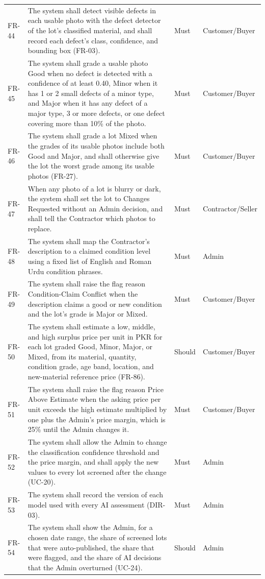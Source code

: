 {\begin{longtable}{@{}p{}p{}p{}p{}@{}}
FR-44 & The system shall detect visible defects in each usable photo with the defect detector of the lot's classified material, and shall record each defect's class, confidence, and bounding box (FR-03). & Must & Customer/Buyer \\
FR-45 & The system shall grade a usable photo Good when no defect is detected with a confidence of at least 0.40, Minor when it has 1 or 2 small defects of a minor type, and Major when it has any defect of a major type, 3 or more defects, or one defect covering more than 10\% of the photo. & Must & Customer/Buyer \\
FR-46 & The system shall grade a lot Mixed when the grades of its usable photos include both Good and Major, and shall otherwise give the lot the worst grade among its usable photos (FR-27). & Must & Customer/Buyer \\
FR-47 & When any photo of a lot is blurry or dark, the system shall set the lot to Changes Requested without an Admin decision, and shall tell the Contractor which photos to replace. & Must & Contractor/Seller \\
FR-48 & The system shall map the Contractor's description to a claimed condition level using a fixed list of English and Roman Urdu condition phrases. & Must & Admin \\
FR-49 & The system shall raise the flag reason Condition-Claim Conflict when the description claims a good or new condition and the lot's grade is Major or Mixed. & Must & Customer/Buyer \\
FR-50 & The system shall estimate a low, middle, and high surplus price per unit in PKR for each lot graded Good, Minor, Major, or Mixed, from its material, quantity, condition grade, age band, location, and new-material reference price (FR-86). & Should & Customer/Buyer \\
FR-51 & The system shall raise the flag reason Price Above Estimate when the asking price per unit exceeds the high estimate multiplied by one plus the Admin's price margin, which is 25\% until the Admin changes it. & Must & Customer/Buyer \\
FR-52 & The system shall allow the Admin to change the classification confidence threshold and the price margin, and shall apply the new values to every lot screened after the change (UC-20). & Must & Admin \\
FR-53 & The system shall record the version of each model used with every AI assessment (DIR-03). & Must & Admin \\
FR-54 & The system shall show the Admin, for a chosen date range, the share of screened lots that were auto-published, the share that were flagged, and the share of AI decisions that the Admin overturned (UC-24). & Should & Admin \\

\end{longtable}}
